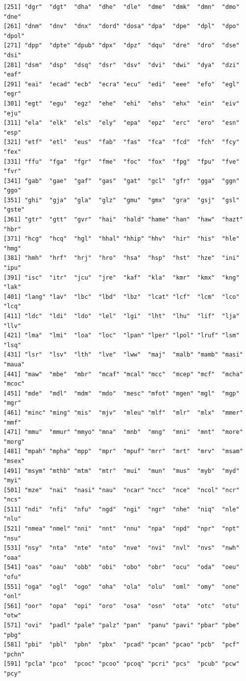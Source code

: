 \documentclass[
  letterpaper,
  DIV=11,
  numbers=noendperiod]{scrreprt}
\begin{document}
\begin{verbatim}
[251] "dgr"  "dgt"  "dha"  "dhe"  "dle"  "dme"  "dmk"  "dmn"  "dmo"  "dne" 
[261] "dnm"  "dnv"  "dnx"  "dord" "dosa" "dpa"  "dpe"  "dpl"  "dpo"  "dpol"
[271] "dpp"  "dpte" "dpub" "dpx"  "dpz"  "dqu"  "dre"  "dro"  "dse"  "dsi" 
[281] "dsm"  "dsp"  "dsq"  "dsr"  "dsv"  "dvi"  "dwi"  "dya"  "dzi"  "eaf" 
[291] "eai"  "ecad" "ecb"  "ecra" "ecu"  "edi"  "eee"  "efo"  "egl"  "egr" 
[301] "egt"  "egu"  "egz"  "ehe"  "ehi"  "ehs"  "ehx"  "ein"  "eiv"  "eju" 
[311] "ela"  "elk"  "els"  "ely"  "epa"  "epz"  "erc"  "ero"  "esn"  "esp" 
[321] "etf"  "etl"  "eus"  "fab"  "fas"  "fca"  "fcd"  "fch"  "fcy"  "fex" 
[331] "ffu"  "fga"  "fgr"  "fme"  "foc"  "fox"  "fpg"  "fpu"  "fve"  "fvr" 
[341] "gab"  "gae"  "gaf"  "gas"  "gat"  "gcl"  "gfr"  "gga"  "ggn"  "ggo" 
[351] "ghi"  "gja"  "gla"  "glz"  "gmu"  "gmx"  "gra"  "gsj"  "gsl"  "gste"
[361] "gtr"  "gtt"  "gvr"  "hai"  "hald" "hame" "han"  "haw"  "hazt" "hbr" 
[371] "hcg"  "hcq"  "hgl"  "hhal" "hhip" "hhv"  "hir"  "his"  "hle"  "hmg" 
[381] "hmh"  "hrf"  "hrj"  "hro"  "hsa"  "hsp"  "hst"  "hze"  "ini"  "ipu" 
[391] "isc"  "itr"  "jcu"  "jre"  "kaf"  "kla"  "kmr"  "kmx"  "kng"  "lak" 
[401] "lang" "lav"  "lbc"  "lbd"  "lbz"  "lcat" "lcf"  "lcm"  "lco"  "lcq" 
[411] "ldc"  "ldi"  "ldo"  "lel"  "lgi"  "lht"  "lhu"  "lif"  "lja"  "llv" 
[421] "lma"  "lmi"  "loa"  "loc"  "lpan" "lper" "lpol" "lruf" "lsm"  "lsq" 
[431] "lsr"  "lsv"  "lth"  "lve"  "lww"  "maj"  "malb" "mamb" "masi" "maua"
[441] "maw"  "mbe"  "mbr"  "mcaf" "mcal" "mcc"  "mcep" "mcf"  "mcha" "mcoc"
[451] "mde"  "mdl"  "mdm"  "mdo"  "mesc" "mfot" "mgen" "mgl"  "mgp"  "mgr" 
[461] "minc" "ming" "mis"  "mjv"  "mleu" "mlf"  "mlr"  "mlx"  "mmer" "mmf" 
[471] "mmu"  "mmur" "mmyo" "mna"  "mnb"  "mng"  "mni"  "mnt"  "more" "morg"
[481] "mpah" "mpha" "mpp"  "mpr"  "mpuf" "mrr"  "mrt"  "mrv"  "msam" "msex"
[491] "msym" "mthb" "mtm"  "mtr"  "mui"  "mun"  "mus"  "myb"  "myd"  "myi" 
[501] "mze"  "nai"  "nasi" "nau"  "ncar" "ncc"  "nce"  "ncol" "ncr"  "ncs" 
[511] "ndi"  "nfi"  "nfu"  "ngd"  "ngi"  "ngr"  "nhe"  "niq"  "nle"  "nlu" 
[521] "nmea" "nmel" "nni"  "nnt"  "nnu"  "npa"  "npd"  "npr"  "npt"  "nsu" 
[531] "nsy"  "nta"  "nte"  "nto"  "nve"  "nvi"  "nvl"  "nvs"  "nwh"  "oaa" 
[541] "oas"  "oau"  "obb"  "obi"  "obo"  "obr"  "ocu"  "oda"  "oeu"  "ofu" 
[551] "oga"  "ogl"  "ogo"  "oha"  "ola"  "olu"  "oml"  "omy"  "one"  "onl" 
[561] "oor"  "opa"  "opi"  "oro"  "osa"  "osn"  "ota"  "otc"  "otu"  "otw" 
[571] "ovi"  "padl" "pale" "palz" "pan"  "panu" "pavi" "pbar" "pbe"  "pbg" 
[581] "pbi"  "pbl"  "pbn"  "pbx"  "pcad" "pcan" "pcao" "pcb"  "pcf"  "pchn"
[591] "pcla" "pco"  "pcoc" "pcoo" "pcoq" "pcri" "pcs"  "pcub" "pcw"  "pcy" 

\end{verbatim}
\end{document}
